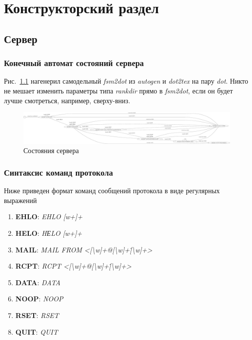 \documentclass[a4paper,12pt]{report}
\begin{document}


\chapter{Конструкторский раздел}

\section{Сервер}

\subsection{Конечный автомат состояний сервера}

Рис.~\ref{fig:server_fsm} нагенерил самодельный \textit{fsm2dot} из \textit{autogen} и \textit{dot2tex} на пару \textit{dot}. Никто не мешает изменить параметры типа \textit{rankdir} прямо в \textit{fsm2dot}, если он будет лучше смотреться, например, сверху-вниз.

\begin{figure}
\centering
\includegraphics[width=\textwidth]{static/server_dot.pdf}
\caption{Состояния сервера}
\label{fig:server_fsm}
\end{figure}

\subsection{Синтаксис команд протокола}
Ниже приведен формат команд сообщений протокола в виде регулярных выражений
\begin{enumerate}
\item \textbf{EHLO}: {\it EHLO [w+]+\/}
\item \textbf{HELO}: {\it HЕLO [w+]+\/}
\item \textbf{MAIL}: {\it MAIL FROM <[\textbackslash w]+@[\textbackslash w]+\.[\textbackslash w]+>\/}
\item \textbf{RCPT}: {\it RCPT <[\textbackslash w]+@[\textbackslash w]+\.[\textbackslash w]+>\/}
\item \textbf{DATA}: {\it DATA\/}
\item \textbf{NOOP}: {\it NOOP\/}
\item \textbf{RSET}: {\it RSET\/}
\item \textbf{QUIT}: {\it QUIT\/}
\end{enumerate}
\end{document}
